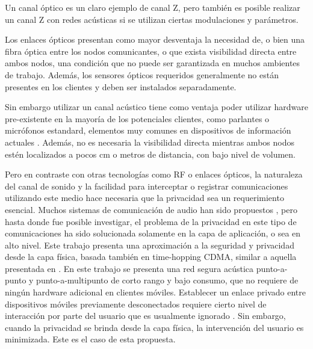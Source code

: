 Un canal óptico es un claro ejemplo de canal Z, pero también es posible realizar un canal Z con redes acústicas si se utilizan ciertas modulaciones y parámetros.

Los enlaces ópticos presentan como mayor desventaja la necesidad de, o bien una fibra óptica entre los nodos comunicantes, o que exista visibilidad directa entre ambos nodos, una condición que no puede ser garantizada en muchos ambientes de trabajo. Además, los sensores ópticos requeridos generalmente no están presentes en los clientes y deben ser instalados separadamente.

Sin embargo utilizar un canal acústico tiene como ventaja poder utilizar hardware pre-existente en la mayoría de los potenciales clientes, como parlantes o micrófonos estandard, elementos muy comunes en dispositivos de información actuales \cite{citeulike:12800468}. Además, no es necesaria la visibilidad directa mientras ambos nodos estén localizados a pocos cm o metros de distancia, con bajo nivel de volumen.

Pero en contraste con otras tecnologías como RF o enlaces ópticos, la naturaleza del canal de sonido y la facilidad para interceptar o registrar comunicaciones utilizando este medio hace necesaria que la privacidad sea un requerimiento esencial. Muchos sistemas de comunicación de audio han sido propuestos \cite{august2002apparatus}, pero hasta donde fue posible investigar, el problema de la privacidad en este tipo de comunicaciones ha sido solucionada solamente en la capa de aplicación, o sea en alto nivel. Este trabajo presenta una aproximación a la seguridad y privacidad desde la capa física, basada también en time-hopping CDMA, similar a aquella presentada en \cite{6476559}. En este trabajo se presenta una red segura acústica punto-a-punto y punto-a-multipunto de corto rango y bajo consumo, que no requiere de ningún hardware adicional en clientes móviles.
Establecer un enlace privado entre dispositivos móviles previamente desconectados requiere cierto nivel de interacción por parte del usuario que es usualmente ignorado \cite{4912753}. Sin embargo, cuando la privacidad se brinda desde la capa física, la intervención del usuario es minimizada. Este es el caso de esta propuesta.


